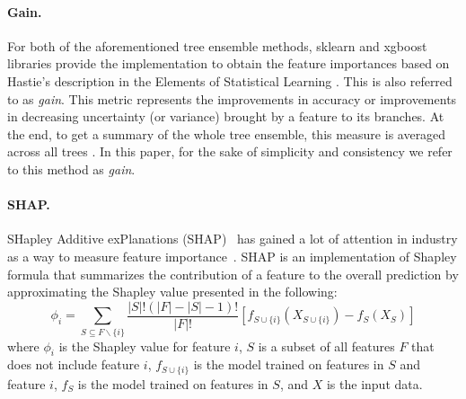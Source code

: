 \paragraph{Gain.}
\label{subsec:default_imp}
For both of the aforementioned tree ensemble methods, sklearn \cite{scikit-learn} and xgboost \cite{Chen:2016:XST:2939672.2939785} libraries provide the implementation to obtain the feature importances based on Hastie's description in the Elements of Statistical Learning \cite{friedman2001elements}. This is also referred to as \emph{gain}. This metric represents the improvements in accuracy or improvements in decreasing uncertainty (or variance) brought by a feature to its branches. At the end, to get a summary of the whole tree ensemble, this measure is averaged across all trees \cite{friedman2001elements,lewinson_2020,abu_2019}. %
In this paper, for the sake of simplicity and consistency we refer to this method as \emph{gain}.

\paragraph{SHAP.} \label{subsec:shap_imp}
SHapley Additive exPlanations (SHAP)~\cite{NIPS2017_7062} has gained a lot of attention in industry as a way to measure feature importance~\cite{bhatt2020explainable}. SHAP is an implementation of Shapley formula that summarizes the contribution of a feature to the overall prediction by approximating the Shapley value presented in the following:
\begin{equation*}
\phi_i = \sum_{S \subseteq F \backslash\{i\}} \frac{|S|!(|F| - |S| - 1)!}{|F|!}
[f_{S\cup\{i\}}(X_{S \cup \{i\}}) - f_S(X_S)]
\end{equation*}
where $\phi_i$ is the Shapley value for feature $i$, $S$ is a subset of all features $F$ that does not include feature $i$, $f_{S\cup\{i\}}$ is the model trained on features in $S$ and feature $i$, $f_S$ is the model trained on features in $S$, and $X$ is the input data. 

